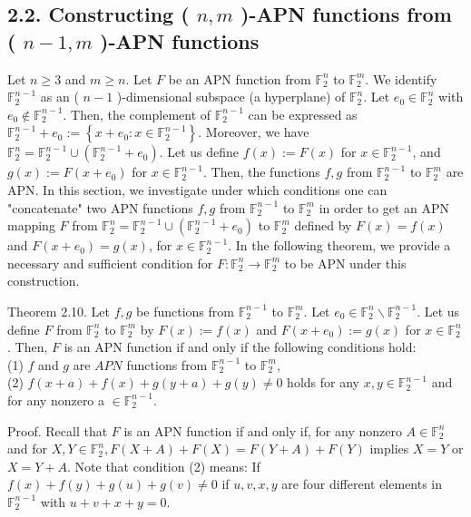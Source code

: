 \documentclass[10pt]{article}
\begin{document}
\subsection*{2.2. Constructing ( $n, m$ )-APN functions from ( $n-1, m$ )-APN functions}
Let $n \geq 3$ and $m \geq n$. Let $F$ be an APN function from $\mathbb{F}_{2}^{n}$ to $\mathbb{F}_{2}^{m}$. We identify $\mathbb{F}_{2}^{n-1}$ as an ( $n-1$ )-dimensional subspace (a hyperplane) of $\mathbb{F}_{2}^{n}$. Let $e_{0} \in \mathbb{F}_{2}^{n}$ with $e_{0} \notin \mathbb{F}_{2}^{n-1}$. Then, the complement of $\mathbb{F}_{2}^{n-1}$ can be expressed as $\mathbb{F}_{2}^{n-1}+e_{0}:=\left\{x+e_{0}: x \in \mathbb{F}_{2}^{n-1}\right\}$. Moreover, we have $\mathbb{F}_{2}^{n}=\mathbb{F}_{2}^{n-1} \cup\left(\mathbb{F}_{2}^{n-1}+e_{0}\right)$. Let us define $f(x):=F(x)$ for $x \in \mathbb{F}_{2}^{n-1}$, and $g(x):=F\left(x+e_{0}\right)$ for $x \in \mathbb{F}_{2}^{n-1}$. Then, the functions $f, g$ from $\mathbb{F}_{2}^{n-1}$ to $\mathbb{F}_{2}^{m}$ are APN. In this section, we investigate under which conditions one can "concatenate" two APN functions $f, g$ from $\mathbb{F}_{2}^{n-1}$ to $\mathbb{F}_{2}^{m}$ in order to get an APN mapping $F$ from $\mathbb{F}_{2}^{n}=\mathbb{F}_{2}^{n-1} \cup\left(\mathbb{F}_{2}^{n-1}+e_{0}\right)$ to $\mathbb{F}_{2}^{m}$ defined by $F(x)=f(x)$ and $F\left(x+e_{0}\right)=g(x)$, for $x \in \mathbb{F}_{2}^{n-1}$. In the following theorem, we provide a necessary and sufficient condition for $F: \mathbb{F}_{2}^{n} \rightarrow \mathbb{F}_{2}^{m}$ to be APN under this construction.

Theorem 2.10. Let $f, g$ be functions from $\mathbb{F}_{2}^{n-1}$ to $\mathbb{F}_{2}^{m}$. Let $e_{0} \in \mathbb{F}_{2}^{n} \backslash \mathbb{F}_{2}^{n-1}$. Let us define $F$ from $\mathbb{F}_{2}^{n}$ to $\mathbb{F}_{2}^{m}$ by $F(x):=f(x)$ and $F\left(x+e_{0}\right):=g(x)$ for $x \in \mathbb{F}_{2}^{n}$. Then, $F$ is an APN function if and only if the following conditions hold:\\
(1) $f$ and $g$ are $A P N$ functions from $\mathbb{F}_{2}^{n-1}$ to $\mathbb{F}_{2}^{m}$,\\
(2) $f(x+a)+f(x)+g(y+a)+g(y) \neq 0$ holds for any $x, y \in \mathbb{F}_{2}^{n-1}$ and for any nonzero a $\in \mathbb{F}_{2}^{n-1}$.

Proof. Recall that $F$ is an APN function if and only if, for any nonzero $A \in \mathbb{F}_{2}^{n}$ and for $X, Y \in \mathbb{F}_{2}^{n}, F(X+A)+F(X)=F(Y+A)+F(Y)$ implies $X=Y$ or $X=Y+A$. Note that condition (2) means: If $f(x)+f(y)+g(u)+g(v) \neq 0$ if $u, v, x, y$ are four different elements in $\mathbb{F}_{2}^{n-1}$ with $u+v+x+y=0$.
\end{document}
